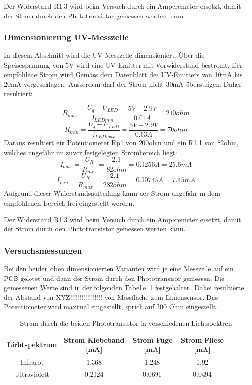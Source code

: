 \documentclass[main.tex]{subfiles} %
\begin{document}
Der Widerstand R1.3 wird beim Versuch durch ein Amperemeter ersetzt, damit der Strom durch den Phototransistor gemessen 
werden kann.


\subsubsection{Dimensionierung UV-Messzelle}
In diesem Abschnitt wird die UV-Messzelle dimensioniert.
Über die Speisespannung von 5V wird eine UV-Emitter mit Vorwiderstand bestromt. Der empfohlene Strom
wird Gemäss dem Datenblatt des UV-Emitters von 10mA bis 20mA vorgeschlagen. Ausserdem darf der Strom nicht 
30mA übersteigen. Daher resultiert: 

\[
    R_{max} = \frac{U_q - U_{LED}}{I_{LEDmin}} = \frac{5V - 2.9V}{0.01A} = 210ohm
\]
\[
    R_{min} = \frac{U_q - U_{LED}}{I_{LEDmax}} = \frac{5V - 2.9V}{0.03A} = 70ohm
\]
Daraus resultiert ein Potentiometer Rp1 von 200ohm und ein R1.1 von 82ohm, welches ungefähr im zuvor festgelegten
Strombereich liegt:
\[
    I_{max} = \frac{U_R}{R_{min}} = \frac{2.1}{82ohm} = 0.0256A = 25.6mA
\]
\[
    I_{min} = \frac{U_R}{R_{max}} = \frac{2.1}{282ohm} = 0.00745A = 7.45mA
\]
Aufgrund dieser Widerstandsaufteilung kann der Strom ungefähr in dem empfohlenen Bereich frei eingestellt werden.


Der Widerstand R1.3 wird beim Versuch durch ein Amperemeter ersetzt, damit der Strom durch den Phototransistor gemessen 
werden kann.

\subsubsection{Versuchsmessungen}
Bei den beiden oben dimensionierten Varianten wird je eine Messzelle auf ein PCB gelötet und dann der Strom durch den
Phototransisor gemessen. Die gemessenen Werte sind in der folgenden Tabelle~\ref{tab:Strommessungen} festgehalten. Dabei resultierte der 
Abstand von XYZ!!!!!!!!!!!!!!!!! von Messfläche zum Liniensensor. Das Potentiometer wird maximal eingestellt, sprich
auf 200 Ohm eingestellt.

\begin{table}[h]                                    
    \centering
    \begin{tabular}{|c|c|c|c|c|c|c|}                        
        \hline
        \textbf{Lichtspektrum} & \textbf{Strom Klebeband [mA]}        & \textbf{Strom Fuge [mA]}    & \textbf{Strom Fliese [mA]}\\ \hline
        Infrarot              & 1.368                                 & 1.248                        & 1.92                       \\ \hline
        Ultraviolett          & 0.2024                                & 0.0691                       & 0.0494                     \\ \hline

        \end{tabular}
\caption{Strom durch die beiden Phototransistor in verschiedenen Lichtspektren}
\label{tab:Strommessungen}
\end{table}
\end{document}
